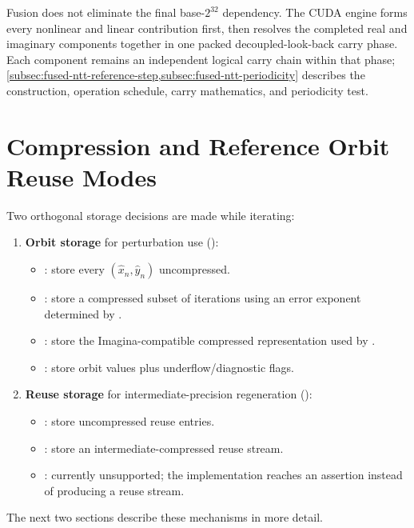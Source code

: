 Fusion does not eliminate the final base-$2^{32}$ dependency.  The CUDA engine forms every
nonlinear and linear contribution first, then resolves the completed real and
imaginary components together in one packed decoupled-look-back carry phase.
Each component remains an independent logical carry chain within that phase;
\cref{subsec:fused-ntt-reference-step,subsec:fused-ntt-periodicity} describes
the construction, operation schedule, carry mathematics, and periodicity test.

\section{Compression and Reference Orbit Reuse Modes}
\label{subsec:ref-orbit-compression-reuse}

Two orthogonal storage decisions are made while iterating:

\begin{enumerate}
  \item \textbf{Orbit storage} for perturbation use ():
  \begin{itemize}
    \item {}: store every \((\hat{x}_n,\hat{y}_n)\) uncompressed.
    \item {}: store a compressed subset of iterations using an error exponent
          determined by .
    \item {}: store the Imagina-compatible compressed
          representation used by .
    \item {}: store orbit values plus underflow/diagnostic flags.
  \end{itemize}
  \item \textbf{Reuse storage} for intermediate-precision regeneration ():
  \begin{itemize}
    \item {}: store uncompressed  reuse entries.
    \item {}: store an intermediate-compressed reuse stream.
    \item {}: currently unsupported; the implementation
          reaches an assertion instead of producing a reuse stream.
  \end{itemize}
\end{enumerate}

The next two sections describe these mechanisms in more detail.


